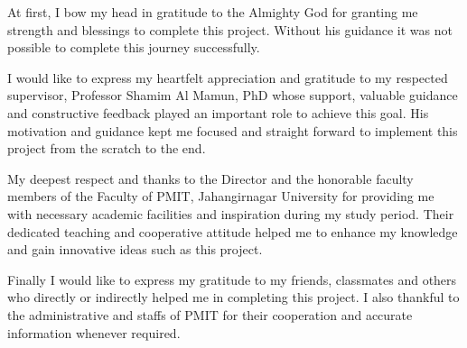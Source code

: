 	
	At first, I bow my head in gratitude to the Almighty God for granting me strength and blessings to complete this project. Without his guidance it was not possible to complete this journey successfully.
	
	I would like to express my heartfelt appreciation and gratitude to my respected supervisor, Professor Shamim Al Mamun, PhD whose support, valuable guidance and constructive feedback played an important role to achieve this goal. His motivation and guidance kept me focused and straight forward to implement this project from the scratch to the end.
	
	
	
	My deepest respect and thanks to the Director and the honorable faculty members of the Faculty of PMIT, Jahangirnagar University for providing me with necessary academic facilities and inspiration during my study period. Their dedicated teaching and cooperative attitude helped me to enhance my knowledge and gain innovative ideas such as this project.
	
	Finally I would like to express my gratitude to my friends, classmates and others who directly or indirectly helped me in completing this project. I also thankful to the administrative and staffs of PMIT for their cooperation and accurate information whenever required.
	
	